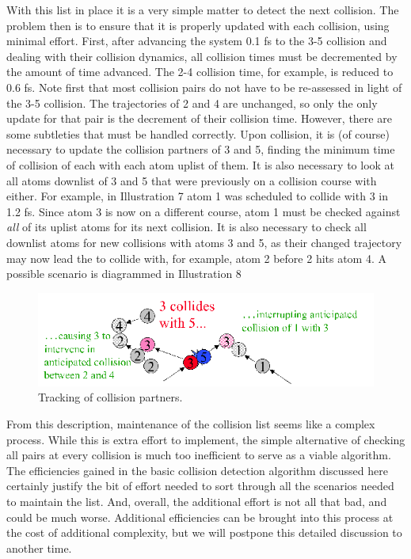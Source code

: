 \documentclass[]{article}
\begin{document}
With this list in place it is a very simple matter to detect the next
collision. The problem then is to ensure that it is properly updated
with each collision, using minimal effort. First, after advancing the
system 0.1 fs to the 3-5 collision and dealing with their collision
dynamics, all collision times must be decremented by the amount of time
advanced. The 2-4 collision time, for example, is reduced to 0.6 fs.
Note first that most collision pairs do not have to be re-assessed in
light of the 3-5 collision. The trajectories of 2 and 4 are unchanged,
so only the only update for that pair is the decrement of their
collision time. However, there are some subtleties that must be handled
correctly. Upon collision, it is (of course) necessary to update the
collision partners of 3 and 5, finding the minimum time of collision of
each with each atom uplist of them. It is also necessary to look at all
atoms downlist of 3 and 5 that were previously on a collision course
with either. For example, in Illustration 7 atom 1 was scheduled to
collide with 3 in 1.2 fs. Since atom 3 is now on a different course,
atom 1 must be checked against \emph{all} of its uplist atoms for its
next collision. It is also necessary to check all downlist atoms for new
collisions with atoms 3 and 5, as their changed trajectory may now lead
the to collide with, for example, atom 2 before 2 hits atom 4. A
possible scenario is diagrammed in Illustration 8

\begin{figure}
  \centering
  \includegraphics[width=\textwidth]{HSMD_figures/image042}
  \caption{\label{fig:collisionTracking}Tracking of collision partners.}
\end{figure}

From this description, maintenance of the collision list seems like a
complex process. 
While this is extra effort to implement, the simple alternative of checking all pairs at every
collision is much too inefficient to serve as a viable algorithm.
The
efficiencies gained in the basic collision detection algorithm discussed
here certainly justify the bit of effort needed to sort through all the
scenarios needed to maintain the list.
And, overall, the additional effort is not all that bad, and could be much worse.
Additional efficiencies can be brought into this process at the cost of
additional complexity, but we will postpone this detailed discussion to
another time. 
\end{document}
